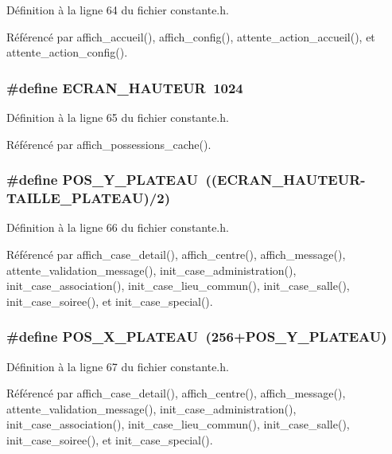 D\'{e}finition \`{a} la ligne 64 du fichier constante.h.

R\'{e}f\'{e}renc\'{e} par affich\_\-accueil(), affich\_\-config(), attente\_\-action\_\-accueil(), et attente\_\-action\_\-config().
\subsubsection{\setlength{\rightskip}{0pt plus 5cm}\#define ECRAN\_\-HAUTEUR~1024}\label{constante_8h_e609a854e4e977d9032b9028dcd4b4db}




D\'{e}finition \`{a} la ligne 65 du fichier constante.h.

R\'{e}f\'{e}renc\'{e} par affich\_\-possessions\_\-cache().
\subsubsection{\setlength{\rightskip}{0pt plus 5cm}\#define POS\_\-Y\_\-PLATEAU~((ECRAN\_\-HAUTEUR-TAILLE\_\-PLATEAU)/2)}\label{constante_8h_4f86249ec6992b6750ace0cf3a3fbe9e}




D\'{e}finition \`{a} la ligne 66 du fichier constante.h.

R\'{e}f\'{e}renc\'{e} par affich\_\-case\_\-detail(), affich\_\-centre(), affich\_\-message(), attente\_\-validation\_\-message(), init\_\-case\_\-administration(), init\_\-case\_\-association(), init\_\-case\_\-lieu\_\-commun(), init\_\-case\_\-salle(), init\_\-case\_\-soiree(), et init\_\-case\_\-special().
\subsubsection{\setlength{\rightskip}{0pt plus 5cm}\#define POS\_\-X\_\-PLATEAU~(256+POS\_\-Y\_\-PLATEAU)}\label{constante_8h_e9106bf5a7a141104226a56804828920}




D\'{e}finition \`{a} la ligne 67 du fichier constante.h.

R\'{e}f\'{e}renc\'{e} par affich\_\-case\_\-detail(), affich\_\-centre(), affich\_\-message(), attente\_\-validation\_\-message(), init\_\-case\_\-administration(), init\_\-case\_\-association(), init\_\-case\_\-lieu\_\-commun(), init\_\-case\_\-salle(), init\_\-case\_\-soiree(), et init\_\-case\_\-special().
